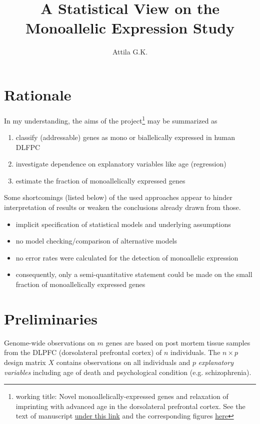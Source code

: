 \documentclass[letterpaper]{article}
\title{A Statistical View on the Monoallelic Expression Study}
\author{Attila G.K.}
\begin{document}
\maketitle

\section{Rationale}

In my understanding, the aims of the project\footnote{working title: Novel
monoallelically-expressed genes and relaxation of imprinting with advanced age
in the dorsolateral prefrontal cortex.  See the text of manuscript
\href{https://docs.google.com/document/d/1cWd4UH98SJR5lihDihC0ZO-C_A1-8MQ5COcixxCLzHE/edit?usp=sharing}{under
this link}
and the corresponding figures
\href{https://docs.google.com/presentation/d/1YvpA1AJ-zzir1Iw0F25tO9x8gkSAzqaO4fjB7K3zBhE/edit?usp=sharing}{here}}
may be summarized as
\begin{enumerate}
\item classify (addressable) genes as mono or biallelically expressed in human DLFPC
\item investigate dependence on explanatory variables like age (regression)
\item estimate the fraction of monoallelically expressed genes 
\end{enumerate}

Some shortcomings (listed below) of the used approaches appear to hinder interpretation of results or
weaken the conclusions already drawn from those.
\begin{itemize}
\item implicit specification of statistical models and underlying assumptions
\item no model checking/comparison of alternative models
\item no error rates were calculated for the detection of monoallelic expression
\item consequently, only a semi-quantitative statement could be made on the
small fraction of monoallelically expressed genes
\end{itemize}

\section{Preliminaries}

Genome-wide observations on $m$ genes are based on post mortem tissue samples from the DLPFC
(dorsolateral prefrontal cortex) of $n$ individuals. The $n \times p$ design
matrix $X$ contains observations on all individuals and $p$ \emph{explanatory variables} including age of death and psychological condition (e.g.
schizophrenia).
\end{document}
